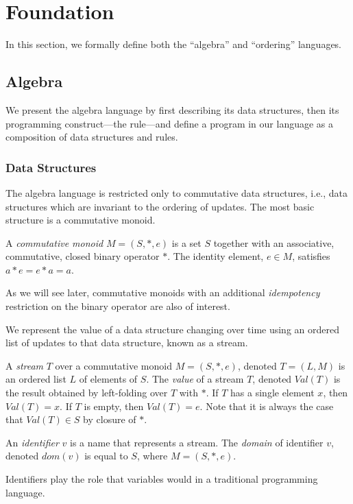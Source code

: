 \section{Foundation}
\label{sec:foundation}

In this section, we formally define both the ``algebra'' and ``ordering'' languages.

\subsection{Algebra}

We present the algebra language by first describing its data structures, then its programming construct---the rule---and define a program in our language as a composition of data structures and rules.

\subsubsection{Data Structures}

The algebra language is restricted only to commutative data structures, i.e., data structures which are invariant to the ordering of updates.  The most basic structure is a commutative monoid.

A {\em commutative monoid} $M = (S, *, e)$ is a set $S$ together with an associative, commutative, closed binary operator $*$.  The identity element, $e \in M$, satisfies $a*e = e*a = a$.

As we will see later, commutative monoids with an additional {\em idempotency} restriction on the binary operator are also of interest.

We represent the value of a data structure changing over time using an ordered list of updates to that data structure, known as a stream.

A {\em stream} $T$ over a commutative monoid $M = (S, *, e)$, denoted $T = (L, M)$ is an ordered list $L$ of elements of $S$.  The {\em value} of a stream $T$, denoted $Val(T)$ is the result obtained by left-folding over $T$ with $*$.  If $T$ has a single element $x$, then $Val(T)=x$.  If $T$ is empty, then $Val(T)=e$.  Note that it is always the case that $Val(T) \in S$ by closure of $*$.

An {\em identifier} $v$ is a name that represents a stream.  The {\em domain} of identifier $v$, denoted $dom(v)$ is equal to $S$, where $M = (S, *, e)$.

Identifiers play the role that variables would in a traditional programming language.

